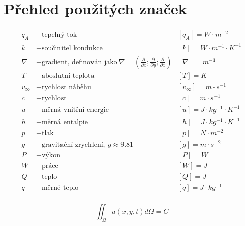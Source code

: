 \documentclass[12pt,a4paper, fleqn]{report}
\begin{document}
\section*{Přehled použitých značek}
\begin{align*}
q_A & - \text{tepelný tok } & [q_A] = W\cdot m^{-2}\\
k & - \text{součinitel kondukce} & [k] = W\cdot m^{-1}\cdot K^{-1}\\
\nabla & - \text{gradient, definován jako}\ \nabla = \displaystyle\left(\frac{\partial}{\partial x};\frac{\partial}{\partial y};\frac{\partial}{\partial x}\right) & [\nabla] = m^{-1}\\
T & - \text{aboslutní teplota} & [T] = K\\
v_{\infty} & - \text{rychlost náběhu} & [v_{\infty}] = m\cdot s^{-1}\\
c & - \text{rychlost} & [c] = m\cdot s^{-1}\\
u & - \text{měrná vnitřní energie} & [u] = J\cdot kg^{-1} \cdot K^{-1}\\
h & - \text{měrná entalpie} & [h] = J\cdot kg^{-1} \cdot K^{-1}\\
p & - \text{tlak} & [p] = N\cdot m^{-2}\\
g & - \text{gravitační zrychlení},\ g \approx 9.81 & [g] = m \cdot s^{-2}\\
P & - \text{výkon} & [P] = W\\ 
W & - \text{práce} & [W] = J\\
Q & - \text{teplo} & [Q] = J\\
q & - \text{měrné teplo} & [q] = J \cdot kg^{-1}\\
\end{align*}

\pagebreak




\[
\iint_{\Omega}u(x,y,t)d\Omega = C
\]
\end{document}
